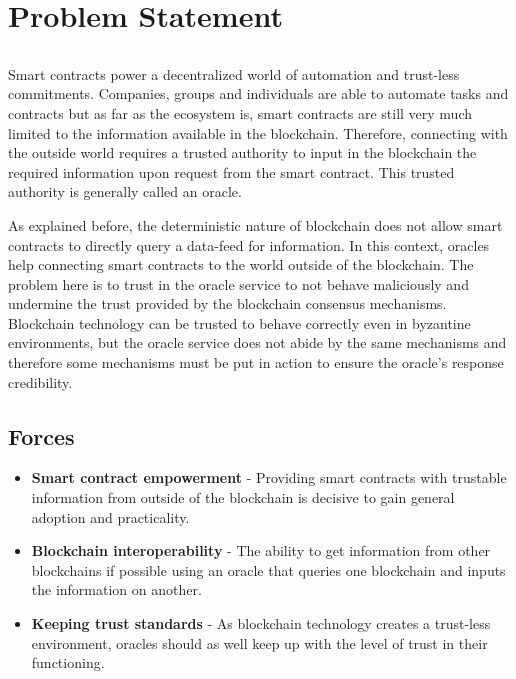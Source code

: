 \chapter{Problem Statement}\label{chap:chap4}

\section*{}


Smart contracts power a decentralized world of automation and trust-less commitments. Companies, groups and individuals are able to automate tasks and contracts but as far as the ecosystem is, smart contracts are still very much limited to the information available in the blockchain. Therefore, connecting with the outside world requires a trusted authority to input in the blockchain the required information upon request from the smart contract. This trusted authority is generally called an oracle.

As explained before, the deterministic nature of blockchain does not allow smart contracts to directly query a data-feed for information. In this context, oracles help connecting smart contracts to the world outside of the blockchain. The problem here is to trust in the oracle service to not behave maliciously and undermine the trust provided by the blockchain consensus mechanisms. Blockchain technology can be trusted to behave correctly even in byzantine environments, but the oracle service does not abide by the same mechanisms and therefore some mechanisms must be put in action to ensure the oracle's response credibility.



\section{Forces}
\begin{itemize}
    \item \textbf{Smart contract empowerment} - Providing smart contracts with trustable information from outside of the blockchain is decisive to gain general adoption and practicality.
    \item \textbf{Blockchain interoperability} - The ability to get information from other blockchains if possible using an oracle that queries one blockchain and inputs the information on another.
    \item \textbf{Keeping trust standards} - As blockchain technology creates a trust-less environment, oracles should as well keep up with the level of trust in their functioning.
\end{itemize}

